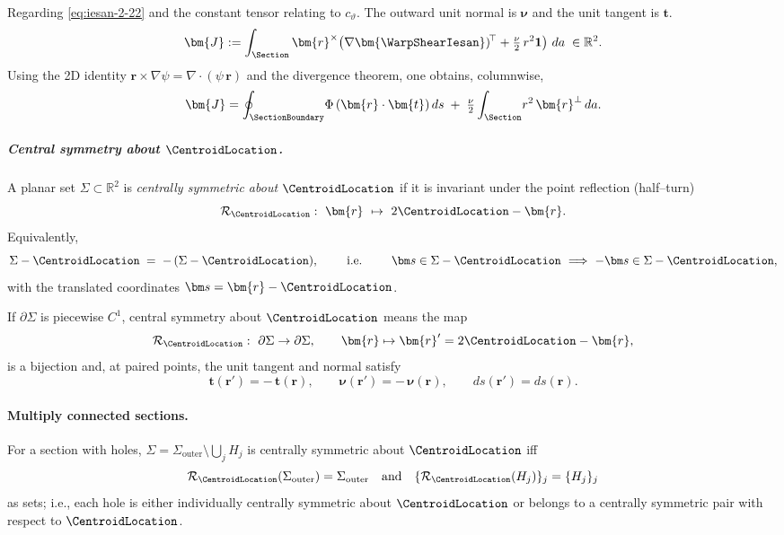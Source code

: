 \begin{Quote}
Regarding \eqref{eq:iesan-2-22} and the constant tensor relating to \(c_{\vartheta}\). 
The outward unit normal is $\bm{\nu}$ and the unit tangent is $\bm{t}$.
\[
\bm{J}
:=\int_{\Section}\bm{r}^\times\!\left(\nabla\bm{\WarpShearIesan})^{\!\top}
+\tfrac{\nu}{2}\,r^2\mathbf{1}\right)\,da
\;\in\mathbb{R}^{2}.
\]
Using the 2D identity \(\bm{r}\times\nabla\psi=\nabla\cdot(\psi\,\bm{r})\)
and the divergence theorem, one obtains, columnwise,
\begin{equation}
\bm{J}
= \oint_{\SectionBoundary}\!\Phi\,(\bm{r}\cdot\bm{t})\,ds
\;+\;\tfrac{\nu}{2}\int_{\Section}\! r^{2}\,\bm{r}^\perp\,da.
\label{eq:J-boundary-form}
\end{equation}

\subparagraph{Central symmetry about \(\CentroidLocation\).}
A planar set \(\Sigma\subset\mathbb R^2\) is \emph{centrally symmetric about \(\CentroidLocation\)} if it is invariant under the point reflection (half–turn)
\[
\mathcal R_{\CentroidLocation}:\ \bm{r}\ \mapsto\ 2\CentroidLocation-\bm{r}.
\]
Equivalently,
\[
\Sigma-\CentroidLocation \;=\; -\,(\Sigma-\CentroidLocation),
\qquad\text{ i.e. }\qquad
\bm s\in\Sigma-\CentroidLocation\ \Longrightarrow\ -\bm s\in\Sigma-\CentroidLocation,
\]
with the translated coordinates \(\bm s=\bm{r}-\CentroidLocation\).

If \(\partial\Sigma\) is piecewise \(C^1\), central symmetry about \(\CentroidLocation\) means the map
\[
\mathcal R_{\CentroidLocation}:\ \partial\Sigma\to\partial\Sigma,\qquad
\bm{r}\mapsto\bm{r}' = 2\CentroidLocation-\bm{r},
\]
is a bijection and, at paired points, the unit tangent and normal satisfy
\[
\bm t(\bm{r}')=-\,\bm t(\bm{r}),\qquad
\bm\nu(\bm{r}')=-\,\bm\nu(\bm{r}),\qquad
ds(\bm{r}')=ds(\bm{r}).
\]

\paragraph{Multiply connected sections.}
For a section with holes, \(\Sigma=\Sigma_{\text{outer}}\setminus\bigcup_{j} H_j\) is centrally symmetric about \(\CentroidLocation\) iff
\[
\mathcal R_{\CentroidLocation}(\Sigma_{\text{outer}})=\Sigma_{\text{outer}}
\quad\text{and}\quad
\{\mathcal R_{\CentroidLocation}(H_j)\}_j=\{H_j\}_j
\]
as sets; i.e., each hole is either individually centrally symmetric about \(\CentroidLocation\) or belongs to a centrally symmetric pair with respect to \(\CentroidLocation\).


\end{Quote}
